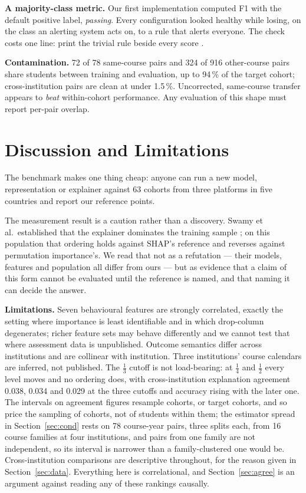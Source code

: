\documentclass[conference]{IEEEtran}
\begin{document}
\textbf{A majority-class metric.} Our first implementation computed F1 with the
default positive label, \emph{passing}. Every configuration looked
healthy while losing, on the class an alerting system acts on, to a rule that
alerts everyone. The check costs one line: print the trivial rule beside every
score \cite{bosch2018}.

\textbf{Contamination.} 72 of 78 same-course pairs and 324 of 916 other-course
pairs share students between training and evaluation, up to 94\,\% of the target
cohort; cross-institution pairs are clean at under 1.5\,\%. Uncorrected,
same-course transfer appears to \emph{beat} within-cohort performance. Any
evaluation of this shape must report per-pair overlap.

\section{Discussion and Limitations}

The benchmark makes one thing cheap: anyone can run a new model, representation or explainer against 63 cohorts from three platforms in five countries and report our reference points.

The measurement result is a caution rather than a discovery. Swamy et al.\ established that the explainer dominates the training sample \cite{swamy2022}; on this population that ordering holds against SHAP's reference and reverses against permutation importance's. We read that not as a refutation --- their models, features and population all differ from ours --- but as evidence that a claim of this form cannot be evaluated until the reference is named, and that naming it can decide the answer.

\textbf{Limitations.} Seven behavioural features are strongly correlated, exactly
the setting where importance is least identifiable and in which
drop-column degenerates; richer feature sets may behave differently and we cannot
test that where assessment data is unpublished. Outcome semantics differ across institutions and are collinear with
institution. Three institutions' course calendars are inferred, not published. The $\tfrac{1}{3}$ cutoff is not load-bearing: at $\tfrac{1}{4}$ and $\tfrac{1}{2}$ every level moves and no ordering does, with cross-institution explanation agreement 0.038, 0.034 and 0.029 at the three cutoffs and accuracy rising with the later one.
The intervals on agreement figures resample cohorts, or target cohorts, and so price the sampling of cohorts, not of students within them; the estimator spread in Section~\ref{sec:cond} rests on 78 course-year pairs, three splits each, from 16 course families at four institutions, and pairs from one family are not independent, so its interval is narrower than a family-clustered one would be. Cross-institution comparisons are descriptive throughout, for the reason given in Section~\ref{sec:data}. Everything here is correlational, and Section~\ref{sec:agree} is an
argument against reading any of these rankings causally.
\end{document}
